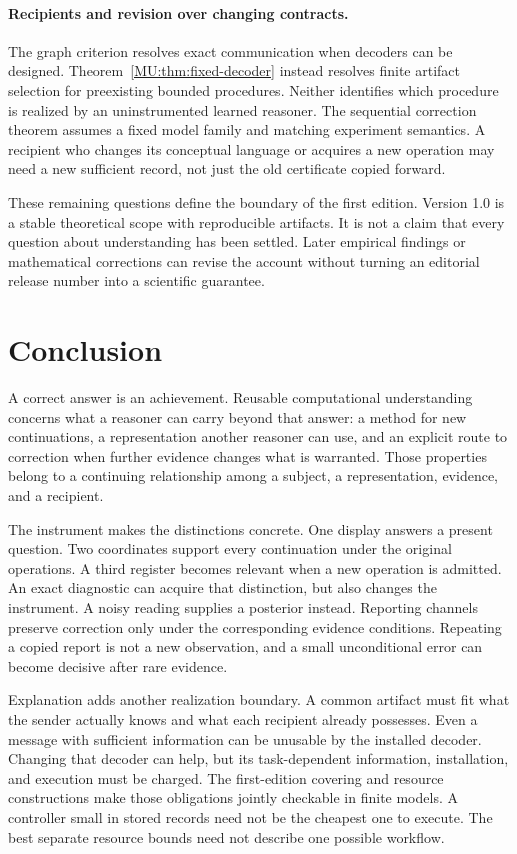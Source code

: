 \paragraph{Recipients and revision over changing contracts.}
The graph criterion resolves exact communication when decoders can be designed. Theorem~\ref{MU:thm:fixed-decoder} instead resolves finite artifact selection for preexisting bounded procedures. Neither identifies which procedure is realized by an uninstrumented learned reasoner. The sequential correction theorem assumes a fixed model family and matching experiment semantics. A recipient who changes its conceptual language or acquires a new operation may need a new sufficient record, not just the old certificate copied forward.

These remaining questions define the boundary of the first edition. Version 1.0 is a stable theoretical scope with reproducible artifacts. It is not a claim that every question about understanding has been settled. Later empirical findings or mathematical corrections can revise the account without turning an editorial release number into a scientific guarantee.

\section{Conclusion}\label{MU:sec:conclusion}
A correct answer is an achievement. Reusable computational understanding concerns what a reasoner can carry beyond that answer: a method for new continuations, a representation another reasoner can use, and an explicit route to correction when further evidence changes what is warranted. Those properties belong to a continuing relationship among a subject, a representation, evidence, and a recipient.

The instrument makes the distinctions concrete. One display answers a present question. Two coordinates support every continuation under the original operations. A third register becomes relevant when a new operation is admitted. An exact diagnostic can acquire that distinction, but also changes the instrument. A noisy reading supplies a posterior instead. Reporting channels preserve correction only under the corresponding evidence conditions. Repeating a copied report is not a new observation, and a small unconditional error can become decisive after rare evidence.

Explanation adds another realization boundary. A common artifact must fit what the sender actually knows and what each recipient already possesses. Even a message with sufficient information can be unusable by the installed decoder. Changing that decoder can help, but its task-dependent information, installation, and execution must be charged. The first-edition covering and resource constructions make those obligations jointly checkable in finite models. A controller small in stored records need not be the cheapest one to execute. The best separate resource bounds need not describe one possible workflow.

